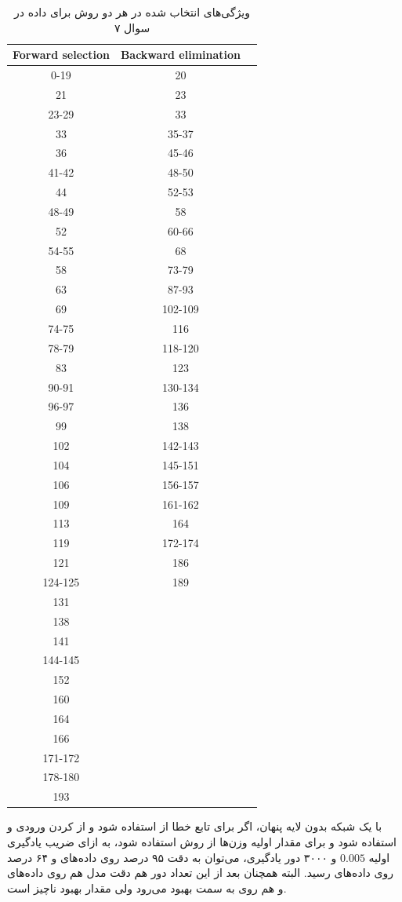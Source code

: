 \documentclass[a4paper,14pt]{extarticle}
\begin{document}
\begin{table}[h]
	\centering
	\caption{ویژگی‌های انتخاب شده در هر دو روش برای داده  در سوال ۷}
	\begin{latin}
		\begin{tabular}{|c|c|c|}
			\hline
			 Forward selection & Backward elimination \\
			\hline
0-19&20\\
21&23\\
23-29&33\\
33&35-37\\
36&45-46\\
41-42&48-50\\
44&52-53\\
48-49&58\\
52&60-66\\
54-55&68\\
58&73-79\\
63&87-93\\
69&102-109\\
74-75&116\\
78-79&118-120\\
83&123\\
90-91&130-134\\
96-97&136\\
99&138\\
102&142-143\\
104&145-151\\
106&156-157\\
109&161-162\\
113&164\\
119&172-174\\
121&186\\
124-125&189\\
131&\\
138&\\
141&\\
144-145&\\
152&\\
160&\\
164&\\
166&\\
171-172&\\
178-180&\\
193&\\
			\hline
		\end{tabular}
	\end{latin}
\end{table}

\newpage
{}
با یک شبکه بدون لایه پنهان، اگر برای تابع خطا از 
استفاده شود و از 
کردن ورودی و 
استفاده شود و برای مقدار اولیه وزن‌ها از روش  استفاده شود، به ازای ضریب یادگیری اولیه 
$0.005$
و ۳۰۰۰ دور یادگیری، می‌توان به دقت ۹۵ درصد روی داده‌های 
و
۶۴ درصد روی داده‌های 
رسید. البته همچنان بعد از این تعداد دور هم دقت مدل هم روی داده‌های 
و هم روی 
به سمت بهبود می‌رود ولی مقدار بهبود ناچیز است.
\end{document}
